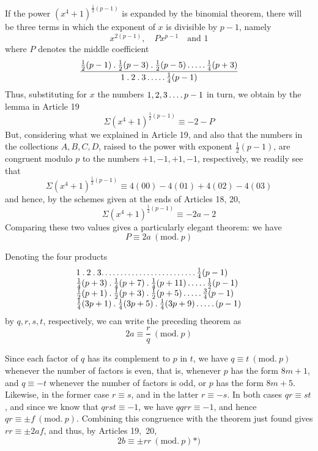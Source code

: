 If the power $(x^4+1)^{\frac12(p-1)}$ is expanded by the binomial theorem, there will be three terms in which the exponent of $x$ is divisible by $p-1$, namely
\[
x^{2(p-1)},\quad Px^{p-1}\quad\text{and }1
\]
%
where $P$ denotes the middle coefficient
\[
\frac{\frac12(p-1)\mathbin{.}\frac12(p-3)\mathbin{.}\frac12(p-5)\mathinner{.\,.\,.\,.\,.}\frac14(p+3)}{1\mathbin{.}2\mathbin{.}3\mathinner{.\,.\,.\,.\,.}\frac14(p-1)}
\]
Thus, substituting for $x$ the numbers $1,2,3\mathinner{.\,.\,.\,.} p-1$ in turn, we obtain by the lemma in Article 19
\[
\Sigma(x^4+1)^{\frac12(p-1)}\equiv-2-P
\]
But, considering what we explained in Article 19, and also that the numbers in the collections $A,B,C,D$, raised to the power with exponent $\frac12(p-1)$, are congruent modulo $p$ to the numbers $+1,-1,+1,-1$, respectively, we readily see that
\[
\Sigma(x^4+1)^{\frac12(p-1)}\equiv4(00)-4(01)+4(02)-4(03)
\]
and hence, by the schemes given at the ends of Articles 18, 20,
\[
\Sigma(x^4+1)^{\frac12(p-1)}\equiv-2a-2
\]
Comparing these two values gives a particularly elegant theorem: we have
\[
P\equiv2a\ (\mathrm{mod.}\ p)
\]

Denoting the four products
\[
\begin{array}{l}
1\mathbin{.}2\mathbin{.}3\mathpunct{.\,.\,.\,.\,.\,.\,.\,.\,.\,.\,.\,.\,.\,.\,.\,.\,.\,.\,.\,.\,.\,.\,.\,.\,.}\frac14(p-1)\\
\frac14(p+3)\mathbin{.}\frac14(p+7)\mathbin{.}\frac14(p+11)\mathinner{.\,.\,.\,.\,.}\frac12(p-1)\\
\frac12(p+1)\mathbin{.}\frac12(p+3)\mathbin{.}\frac12(p+5)\mathinner{.\,.\,.\,.\,.}\frac34(p-1)\\
\frac14(3p+1)\mathbin{.}\frac14(3p+5)\mathbin{.}\frac14(3p+9)\mathinner{.\,.\,.\,.\,.}(p-1)
\end{array}
\]
by $q,r,s,t$, respectively, we can write the preceding theorem as
\[
2a\equiv\frac rq\ (\mathrm{mod.}\ p)
\]

Since each factor of $q$ has its complement to $p$ in $t$, we have $q\equiv t\ (\mathrm{mod.}\ p)$ whenever the number of factors is even, that is, whenever $p$ has the form $8m+1$, and $q\equiv-t$ whenever the number of factors is odd, or $p$ has the form $8m+5$. Likewise, in the former case $r\equiv s$, and in the latter $r\equiv-s$. In both cases $qr\equiv st$, and since we know that $qrst\equiv-1$, we have $qqrr\equiv-1$,
%
and hence $qr\equiv\pm f\ (\mathrm{mod.}\ p)$. Combining this congruence with the theorem just found gives $rr\equiv\pm2af$, and thus, by Articles \mbox{19, 20},
\[
2b\equiv\pm rr\ (\mathrm{mod.}\ p)\text{*)}
\]
\begingroup\renewcommand{\thefootnote}{*)}\endgroup

